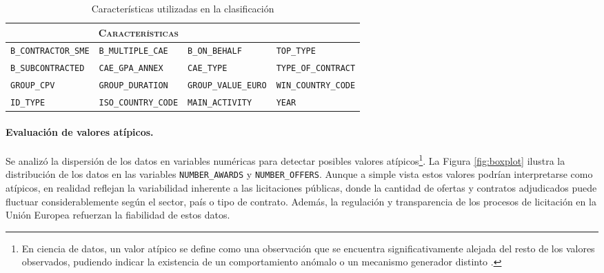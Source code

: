 \documentclass[a4paper,fleqn]{cas-sc}
\begin{document}
\begin{table}[t]
	\centering
	\scriptsize
	\setlength{\tabcolsep}{7pt}
	\renewcommand{\arraystretch}{1.3} %
	\caption{Características utilizadas en la clasificación}	
	\label{tab:variables_clasificar}	
	\begin{adjustbox}{max width=\textwidth}	
		\begin{tabular}{p{3cm}p{3cm}p{3cm}p{3cm}}			
			\hline
			\multicolumn{3}{c}{\textsc{\textbf{Características}}} \\ \hline
			{\texttt{B\_CONTRACTOR\_SME}}    & {\texttt{B\_MULTIPLE\_CAE}}   &  \texttt{B\_ON\_BEHALF}   & {\texttt{TOP\_TYPE}} \\ %
			{\texttt{B\_SUBCONTRACTED}}    & {\texttt{CAE\_GPA\_ANNEX}}   &  \texttt{CAE\_TYPE}  & {\texttt{TYPE\_OF\_CONTRACT}}\\ %
			{\texttt{GROUP\_CPV}}    & {\texttt{GROUP\_DURATION}}   &  \texttt{GROUP\_VALUE\_EURO}  & \texttt{WIN\_COUNTRY\_CODE} \\ %
			{\texttt{ID\_TYPE}}    & {\texttt{ISO\_COUNTRY\_CODE}}   &  \texttt{MAIN\_ACTIVITY}  & {\texttt{YEAR}} \\ \hline
		\end{tabular}
	\end{adjustbox}		

\end{table}


\paragraph{\textbf{Evaluación de valores atípicos.}}

	Se analizó la dispersión de los datos en variables numéricas para detectar posibles valores atípicos\footnote{En ciencia de datos, un valor atípico se define como una observación que se encuentra significativamente alejada del resto de los valores observados, pudiendo indicar la existencia de un comportamiento anómalo o un mecanismo generador distinto \cite{Hawkins1980,Aggarwal2017,Hodge2004}.}. 
La Figura \ref{fig:boxplot} ilustra la distribución de los datos en las variables \texttt{NUMBER\_AWARDS} y \texttt{NUMBER\_OFFERS}. Aunque a simple vista estos valores podrían interpretarse como atípicos, en realidad reflejan la variabilidad inherente a las licitaciones públicas, donde la cantidad de ofertas y contratos adjudicados puede fluctuar considerablemente según el sector, país o tipo de contrato. Además, la regulación y transparencia de los procesos de licitación en la Unión Europea refuerzan la fiabilidad de estos datos. 
\end{document}
